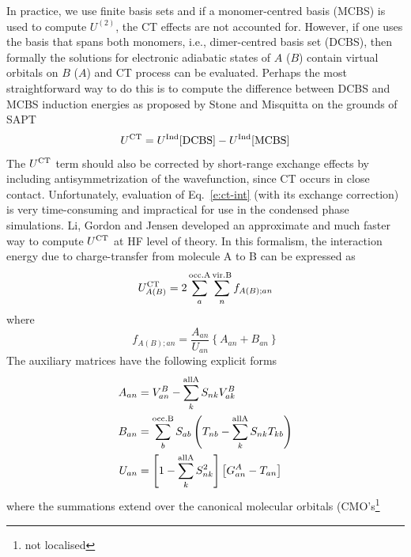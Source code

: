 \documentclass[a4paper,titlepage,twoside,fleqn,12pt]{book}
\begin{document}
\begin{refsection}
In practice, 
we use finite basis sets and if a monomer\hyp{}centred basis (MCBS)
is used to compute $U^{(2)}$, the CT effects are not accounted for.
However, if one uses the basis that spans both monomers, i.e., 
dimer\hyp{}centred basis set (DCBS), then
formally the solutions for electronic adiabatic states of $A$ ($B$) contain
virtual orbitals on $B$ ($A$) and CT process can be evaluated.
Perhaps the most straightforward way to do this is to compute
the difference between DCBS and MCBS induction energies as proposed 
by Stone and Misquitta \citep{Stone.Misquitta.CPL.2009}
on the grounds of SAPT \citep{Jeziorski.Moszynski.Szalewicz.ChemRev.1994}
%
\begin{equation} \label{e:ct-int}
 U^{\rm CT} = U^{\rm Ind}[{\rm DCBS}] - U^{\rm Ind}[{\rm MCBS}]
\end{equation}
%
The $U^{\rm CT}$ term should also be corrected by short\hyp{}range
exchange effects by including antisymmetrization of the
wavefunction, \citep{Stone.Misquitta.CPL.2009} since CT occurs 
in close contact.
Unfortunately, evaluation of Eq.~\eqref{e:ct-int} (with its 
exchange correction) is very
time\hyp{}consuming and impractical for use in the condensed
phase simulations. Li, Gordon and Jensen developed
an approximate and much faster way to compute $U^{\rm CT}$
at HF level of theory. \citep{Li.Gordon.Jensen.JCP.2006}
In this formalism, the interaction energy due to charge\hyp{}transfer
from molecule A to B
can be expressed as
%
\begin{equation}  \label{e:ct-int-efp}
 U^{\rm CT}_{A(B)} = 2\sum_a^{\rm occ. A} \sum_n^{\rm vir. B} f_{A(B);an}
\end{equation}
%
where
%
\begin{equation}  
  f_{A(B);an} = \frac{A_{an}}{U_{an}} \left\{ A_{an} + B_{an} \right\}
\end{equation}
%
The auxiliary matrices have the following explicit forms
%
\begin{subequations}  
\begin{align}
 A_{an}  &= V_{an}^{B} - \sum_k^{\rm all A} S_{nk} V_{ak}^B \\
 B_{an}  &= \sum_b^{\rm occ. B} S_{ab} \left( 
         T_{nb} - \sum_k^{\rm all A} S_{nk} T_{kb}
     \right) \\
 U_{an}  &= \left[1 - \sum_k^{\rm all A} S_{nk}^2 \right] 
            \left[ G^A_{an} - T_{an}\right]
\end{align}
\end{subequations}
%
where the summations extend over the canonical molecular orbitals (CMO's\footnote{not localised
}
\end{refsection}
\end{document}
